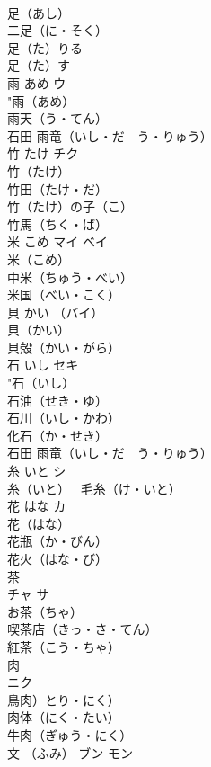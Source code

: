 \documentclass[8pt]{extreport}
\begin{document}
\begin{CJK}{UTF8}{min}
\\	足（あし）　
\\	二足（に・そく）　
\\	足（た）りる　
\\	足（た）す　
\\	雨	あめ	ウ	
\\	"雨（あめ）　
\\	雨天（う・てん）　
\\	石田 雨竜（いし・だ　う・りゅう） 
\\	竹	たけ	チク	
\\	竹（たけ）　
\\	竹田（たけ・だ）　
\\	竹（たけ）の子（こ）　
\\	竹馬（ちく・ば）　
\\	米	こめ	マイ ベイ	
\\	米（こめ）　
\\	中米（ちゅう・べい）　
\\	米国（べい・こく）　
\\	貝	かい	（バイ）	
\\	貝（かい）　
\\	貝殻（かい・がら）　
\\	石	いし	セキ	
\\	"石（いし）　
\\	石油（せき・ゆ）　
\\	石川（いし・かわ）　
\\	化石（か・せき）　
\\	石田 雨竜（いし・だ　う・りゅう） 
\\	糸	いと	シ 
\\	糸（いと）　 毛糸（け・いと）		
\\	花	はな	カ	
\\	花（はな）　
\\	花瓶（か・びん）　
\\	花火（はな・び）　
\\	茶	
\\	チャ サ	
\\	お茶（ちゃ）　
\\	喫茶店（きっ・さ・てん）　
\\	紅茶（こう・ちゃ）　
\\	肉	
\\	ニク	
\\	鳥肉）とり・にく）　
\\	肉体（にく・たい）　
\\	牛肉（ぎゅう・にく）　
\\	文	（ふみ）	ブン モン	

\end{CJK}
\end{document}
